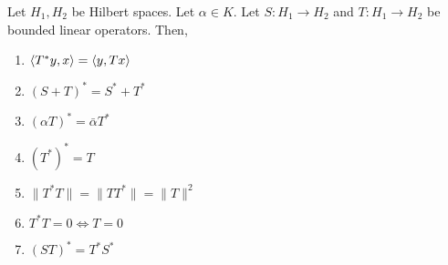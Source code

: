 \begin{theorem}
	Let $H_1,H_2$ be Hilbert spaces.
	Let $\alpha \in K$.
	Let $S : H_1 \to H_2$ and $T : H_1 \to H_2$ be bounded linear operators.
	Then,
	\begin{enumerate}
	\item $\left\langle T^\ast y,x \right\rangle = \left\langle y,Tx \right\rangle$
	\item $(S+T)^\ast = S^\ast + T^\ast$
	\item $(\alpha T)^\ast = \bar{\alpha} T^\ast$
	\item $(T^\ast)^\ast = T$
	\item $\|T^\ast T\| = \|T T^\ast\| = \|T\|^2$
	\item $T^\ast T = 0 \iff T = 0$
	\item $(ST)^\ast = T^\ast S^\ast$
	\end{enumerate}
\end{theorem}
